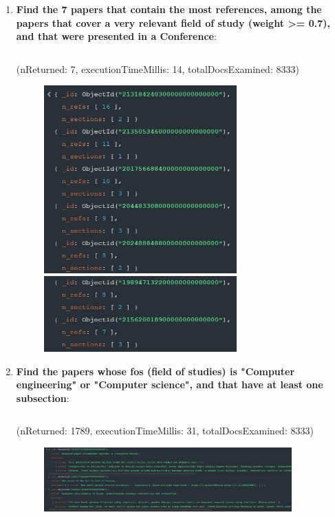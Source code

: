 \documentclass{Configuration_Files/PoliMi3i_thesis}
\begin{document}
\begin{enumerate}
    \item \textbf{Find the 7 papers that contain the most references, among the papers that cover a very relevant field of study (weight >= 0.7), and that were presented in a Conference}:
    \inputminted[linenos,tabsize=2,breaklines]{MQL}{code/queries_mongodb/query_5.txt}
    (nReturned: 7, executionTimeMillis: 14, totalDocsExamined: 8333)
    \begin{figure}[H]
        \centering
        \includegraphics[width=0.7\textwidth]{Images/queries_mongodb/query_5_1.jpg}
        \includegraphics[width=0.7\textwidth]{Images/queries_mongodb/query_5_2.jpg}
    \end{figure}
    
    \item \textbf{Find the papers whose fos (field of studies) is "Computer engineering" or "Computer science", and that have at least one subsection}:
    \inputminted[linenos,tabsize=2,breaklines]{MQL}{code/queries_mongodb/query_6.txt}
    (nReturned: 1789, executionTimeMillis: 31, totalDocsExamined: 8333)
    \begin{figure}[H]
        \centering
        \includegraphics[width=0.9\textwidth]{Images/queries_mongodb/query_6.jpg}
    \end{figure}
    

\end{enumerate}
\end{document}
